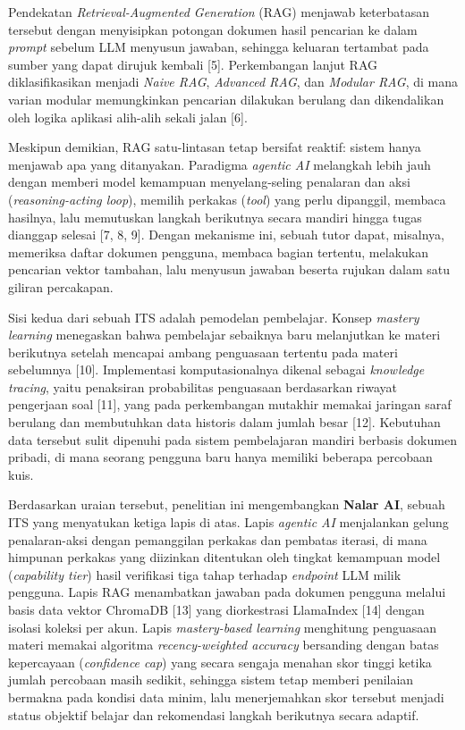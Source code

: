 \documentclass[12pt,a4paper]{article}
\begin{document}
Pendekatan \textit{Retrieval-Augmented Generation} (RAG) menjawab keterbatasan tersebut dengan menyisipkan potongan dokumen hasil pencarian ke dalam \textit{prompt} sebelum LLM menyusun jawaban, sehingga keluaran tertambat pada sumber yang dapat dirujuk kembali {[}5{]}. Perkembangan lanjut RAG diklasifikasikan menjadi \textit{Naive RAG}, \textit{Advanced RAG}, dan \textit{Modular RAG}, di mana varian modular memungkinkan pencarian dilakukan berulang dan dikendalikan oleh logika aplikasi alih-alih sekali jalan {[}6{]}.



Meskipun demikian, RAG satu-lintasan tetap bersifat reaktif: sistem hanya menjawab apa yang ditanyakan. Paradigma \textit{agentic AI} melangkah lebih jauh dengan memberi model kemampuan menyelang-seling penalaran dan aksi (\textit{reasoning-acting loop}), memilih perkakas (\textit{tool}) yang perlu dipanggil, membaca hasilnya, lalu memutuskan langkah berikutnya secara mandiri hingga tugas dianggap selesai {[}7, 8, 9{]}. Dengan mekanisme ini, sebuah tutor dapat, misalnya, memeriksa daftar dokumen pengguna, membaca bagian tertentu, melakukan pencarian vektor tambahan, lalu menyusun jawaban beserta rujukan dalam satu giliran percakapan.



Sisi kedua dari sebuah ITS adalah pemodelan pembelajar. Konsep \textit{mastery learning} menegaskan bahwa pembelajar sebaiknya baru melanjutkan ke materi berikutnya setelah mencapai ambang penguasaan tertentu pada materi sebelumnya {[}10{]}. Implementasi komputasionalnya dikenal sebagai \textit{knowledge tracing}, yaitu penaksiran probabilitas penguasaan berdasarkan riwayat pengerjaan soal {[}11{]}, yang pada perkembangan mutakhir memakai jaringan saraf berulang dan membutuhkan data historis dalam jumlah besar {[}12{]}. Kebutuhan data tersebut sulit dipenuhi pada sistem pembelajaran mandiri berbasis dokumen pribadi, di mana seorang pengguna baru hanya memiliki beberapa percobaan kuis.



Berdasarkan uraian tersebut, penelitian ini mengembangkan \textbf{Nalar AI}, sebuah ITS yang menyatukan ketiga lapis di atas. Lapis \textit{agentic AI} menjalankan gelung penalaran-aksi dengan pemanggilan perkakas dan pembatas iterasi, di mana himpunan perkakas yang diizinkan ditentukan oleh tingkat kemampuan model (\textit{capability tier}) hasil verifikasi tiga tahap terhadap \textit{endpoint} LLM milik pengguna. Lapis RAG menambatkan jawaban pada dokumen pengguna melalui basis data vektor ChromaDB {[}13{]} yang diorkestrasi LlamaIndex {[}14{]} dengan isolasi koleksi per akun. Lapis \textit{mastery-based learning} menghitung penguasaan materi memakai algoritma \textit{recency-weighted accuracy} bersanding dengan batas kepercayaan (\textit{confidence cap}) yang secara sengaja menahan skor tinggi ketika jumlah percobaan masih sedikit, sehingga sistem tetap memberi penilaian bermakna pada kondisi data minim, lalu menerjemahkan skor tersebut menjadi status objektif belajar dan rekomendasi langkah berikutnya secara adaptif.
\end{document}
